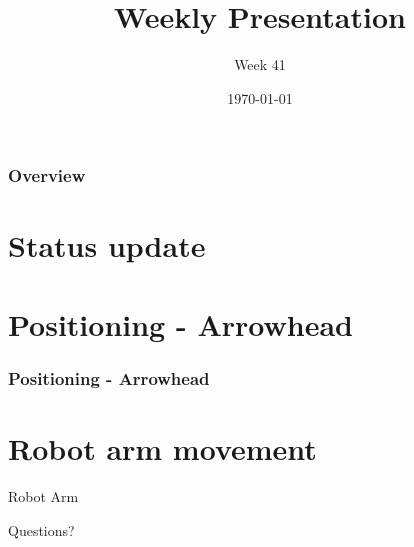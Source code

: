 \documentclass{beamer}
\title{Weekly Presentation}
\subtitle{Week 41}
\author{}
\institute{Luleå University of Technology}
\date{\today}
\begin{document}
\begin{frame}
    \titlepage
\end{frame}

\begin{frame}
    \frametitle{Overview}
    \tableofcontents
\end{frame}

\section{Status update}




\section{Positioning - Arrowhead}

\begin{frame}
    \frametitle{Positioning - Arrowhead}
    \centering
    
\end{frame}

\section{Robot arm movement}
\begin{frame}
    \centering
    \Huge Robot Arm
    
\end{frame}





\begin{frame}
    \begin{center}
        \Huge Questions?
    \end{center}
\end{frame}
\end{document}
